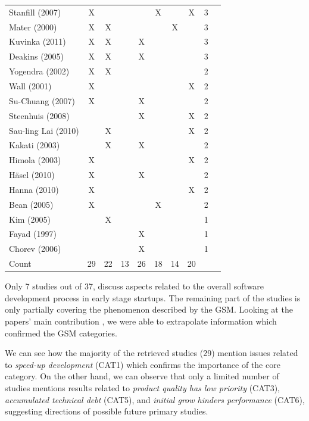 \documentclass[10pt,journal,letterpaper,compsoc]{IEEEtran}
\begin{document}
\begin{table}[!t]
\begin{tabular}{|l||c||c||c||c||c||c||c||c||c|}
Stanfill (2007) & X &  &  &  & X &  & X & 3 & \cite{Stanfill2007} \\
Mater (2000) & X & X &  &  &  & X &  & 3 & \cite{Mater2000} \\
Kuvinka (2011) & X & X &  & X &  &  &  & 3 & \cite{Kuvinka2011} \\
Deakins (2005) & X & X &  & X &  &  &  & 3 & \cite{Deakins2005} \\
Yogendra (2002) & X & X &  &  &  &  &  & 2 & \cite{Yogendra2002} \\
Wall (2001) & X &  &  &  &  &  & X & 2 & \cite{Wall2001} \\
Su-Chuang (2007) & X &  &  & X &  &  &  & 2 & \cite{Su-Chan2007} \\
Steenhuis (2008) &  &  &  & X &  &  & X & 2 & \cite{Steenhuis2008} \\
Sau-ling Lai (2010) &  & X &  &  &  &  & X & 2 & \cite{Lai2010} \\
Kakati (2003) &  & X &  & X &  &  &  & 2 & \cite{Kakati2003} \\
Himola (2003) & X &  &  &  &  &  & X & 2 & \cite{Hilmola2003} \\
H\"{a}sel (2010) & X &  &  & X &  &  &  & 2 & \cite{Hasel2010} \\
Hanna (2010) & X &  &  &  &  &  & X  & 2 & \cite{Hanna2010} \\
Bean (2005) & X &  &  &  & X &  &  & 2 & \cite{Bean2005} \\
Kim (2005) &  & X &  &  &  &  &  & 1 & \cite{Kim2005} \\
Fayad (1997) &  &  &  & X &  &  &  & 1 & \cite{Fayad1997} \\
Chorev (2006) &  &  &  & X &  &  &  & 1 & \cite{Chorev2006} \\
\hline
Count & 29 & 22 & 13 & 26 & 18 & 14 & 20 & &\\
\hline
\end{tabular}
\end{table}
 
Only 7 studies out of 37, discuss aspects related to the overall software 
development process in early stage startups. The remaining part of the studies 
is only partially covering the phenomenon described by the GSM. Looking at the 
papers' main contribution%
, we were able to extrapolate information which confirmed the GSM categories.

We can see how the majority of the retrieved studies (29) mention issues 
related to \textit{speed-up development} (CAT1) which confirms the importance of 
the core category. On the other hand, we can observe that only a limited number 
of studies mentions results related to \textit{product quality has low priority} 
(CAT3), \textit{accumulated technical debt} (CAT5), and \textit{initial grow 
hinders performance} (CAT6), suggesting directions of possible future primary 
studies.
\end{document}
